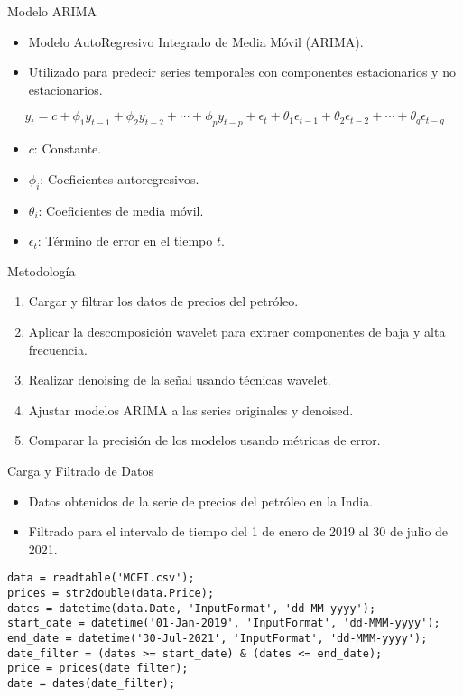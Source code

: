 \documentclass{beamer}
\begin{document}
\begin{frame}{Modelo ARIMA}
\begin{itemize}
    \item Modelo AutoRegresivo Integrado de Media Móvil (ARIMA).
    \item Utilizado para predecir series temporales con componentes estacionarios y no estacionarios.
\end{itemize}
\begin{equation}
    y_t = c + \phi_1 y_{t-1} + \phi_2 y_{t-2} + \cdots + \phi_p y_{t-p} + \epsilon_t + \theta_1 \epsilon_{t-1} + \theta_2 \epsilon_{t-2} + \cdots + \theta_q \epsilon_{t-q}
\end{equation}
\begin{itemize}
    \item $c$: Constante.
    \item $\phi_i$: Coeficientes autoregresivos.
    \item $\theta_i$: Coeficientes de media móvil.
    \item $\epsilon_t$: Término de error en el tiempo \(t\).
\end{itemize}
\end{frame}

\begin{frame}{Metodología}
\begin{enumerate}
    \item Cargar y filtrar los datos de precios del petróleo.
    \item Aplicar la descomposición wavelet para extraer componentes de baja y alta frecuencia.
    \item Realizar denoising de la señal usando técnicas wavelet.
    \item Ajustar modelos ARIMA a las series originales y denoised.
    \item Comparar la precisión de los modelos usando métricas de error.
\end{enumerate}
\end{frame}

\begin{frame}{Carga y Filtrado de Datos}
\begin{itemize}
    \item Datos obtenidos de la serie de precios del petróleo en la India.
    \item Filtrado para el intervalo de tiempo del 1 de enero de 2019 al 30 de julio de 2021.
\end{itemize}
\begin{verbatim}
data = readtable('MCEI.csv');
prices = str2double(data.Price);
dates = datetime(data.Date, 'InputFormat', 'dd-MM-yyyy');
start_date = datetime('01-Jan-2019', 'InputFormat', 'dd-MMM-yyyy');
end_date = datetime('30-Jul-2021', 'InputFormat', 'dd-MMM-yyyy');
date_filter = (dates >= start_date) & (dates <= end_date);
price = prices(date_filter);
date = dates(date_filter);
\end{verbatim}
\end{frame}
\end{document}
